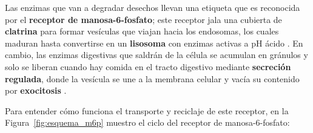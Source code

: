 \documentclass[12pt,spanish,letterpaper,oneside]{article}
\begin{document}
Las enzimas que van a degradar desechos llevan una etiqueta que es reconocida por el \textbf{receptor de manosa-6-fosfato}; este receptor jala una cubierta de \textbf{clatrina} para formar vesículas que viajan hacia los endosomas, los cuales maduran hasta convertirse en un \textbf{lisosoma} con enzimas activas a pH ácido \parencite{kierszenbaum2020histologia, lieberman2018marks}. En cambio, las enzimas digestivas que saldrán de la célula se acumulan en gránulos y solo se liberan cuando hay comida en el tracto digestivo mediante \textbf{secreción regulada}, donde la vesícula se une a la membrana celular y vacía su contenido por \textbf{exocitosis} \parencite{kierszenbaum2020histologia, karp2019biologia}.

Para entender cómo funciona el transporte y reciclaje de este receptor, en la Figura~\ref{fig:esquema_m6p} muestro el ciclo del receptor de manosa-6-fosfato:
\end{document}

